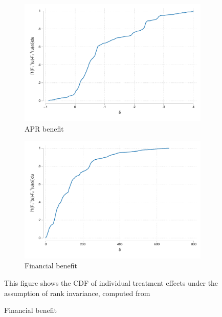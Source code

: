 \vspace{.2in}
\begin{figure}[H]
        \caption{Distribution of treatment effects under rank invariance.}
    \label{te_rankinvariance}
    
    \begin{center}
       \begin{subfigure}{0.49\textwidth}
        \caption{APR benefit}
        \centering
        \includegraphics[width=\textwidth]{Figuras/te_rankinvariance_apr.pdf}
    \end{subfigure} 
   \begin{subfigure}{0.49\textwidth}
        \caption{Financial benefit}
        \centering
        \includegraphics[width=\textwidth]{Figuras/te_rankinvariance_fc_admin.pdf}
    \end{subfigure} 
    \end{center}
    \scriptsize This figure shows the CDF of individual treatment effects under the assumption of rank invariance, computed from 

\end{figure}
